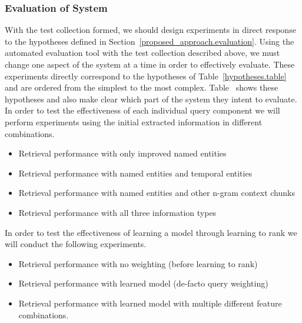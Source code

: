 \documentclass{mprop}
\let\oldcite=\cite
\renewcommand\cite[1]{\ifthenelse{\equal{#1}{NEEDED}}{\ensuremath{^\texttt{[citation~needed]}}}{\oldcite{#1}}}
\begin{document}
\subsubsection{Evaluation of System}
With the test collection formed, we should design experiments in direct response to the hypotheses defined in Section~\ref{proposed_approach.evaluation}.
Using the automated evaluation tool with the test collection described above, we must change one aspect of the system at a time in order to effectively evaluate.
These experiments directly correspond to the hypotheses of Table~\ref{hypotheses.table} and are ordered from the simplest to the most complex. Table~\cite{NEEDED} shows these hypotheses and also make clear which part of the system they intent to evaluate.
In order to test the effectiveness of each individual query component we will perform experiments using the initial extracted information in different combinations.
\begin{itemize}
\item Retrieval performance with only improved named entities 
\item Retrieval performance with named entities and temporal entities
\item Retrieval performance with named entities and other n-gram context chunks
\item Retrieval performance with all three information types
\end{itemize}
In order to test the effectiveness of learning a model through learning to rank we will conduct the following experiments.
\begin{itemize}
\item Retrieval performance with no weighting (before learning to rank)
\item Retrieval performance with learned model (de-facto query weighting)
\item Retrieval performance with learned model with multiple different feature combinations.
\end{itemize}
\end{document}
